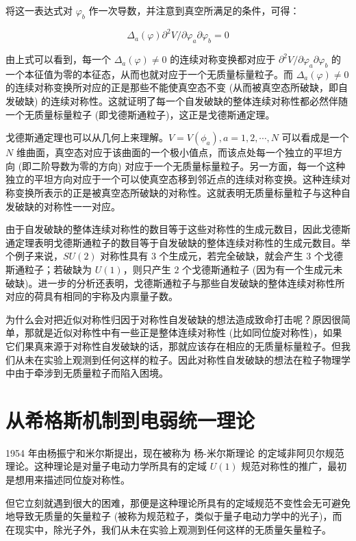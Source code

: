 \noindent 将这一表达式对 $\varphi_b$ 作一次导数，并注意到真空所满足的条件，可得：

\begin{equation}
    \Delta_a(\varphi) \partial^2 V/\partial \varphi_a \partial \varphi_b=0
\end{equation}

\noindent 由上式可以看到，每一个 $\Delta_a(\varphi) \ne 0$ 的连续对称变换都对应于 $\partial^2 V/\partial \varphi_a \partial \varphi_b$ 的一个本征值为零的本征态，从而也就对应于一个无质量标量粒子。而 $\Delta_a(\varphi) \ne 0$ 的连续对称变换所对应的正是那些不能使真空态不变 (从而被真空态所破缺，即自发破缺) 的连续对称性。这就证明了每一个自发破缺的整体连续对称性都必然伴随一个无质量标量粒子 (即戈德斯通粒子)，这正是戈德斯通定理。

戈德斯通定理也可以从几何上来理解。$V=V(\phi_a), a=1, 2, \cdots, N$ 可以看成是一个 $N$ 维曲面，真空态对应于该曲面的一个极小值点，而该点处每一个独立的平坦方向 (即二阶导数为零的方向) 对应于一个无质量标量粒子。另一方面，每一个这种独立的平坦方向对应于一个可以使真空态移到邻近点的连续对称变换。这种连续对称变换所表示的正是被真空态所破缺的对称性。这就表明无质量标量粒子与这种自发破缺的对称性一一对应。

由于自发破缺的整体连续对称性的数目等于这些对称性的生成元数目，因此戈德斯通定理表明戈德斯通粒子的数目等于自发破缺的整体连续对称性的生成元数目。举个例子来说，$SU(2)$ 对称性具有 $3$ 个生成元，若完全破缺，就会产生 $3$ 个戈德斯通粒子；若破缺为 $U(1)$，则只产生 $2$ 个戈德斯通粒子 (因为有一个生成元未破缺)。进一步的分析还表明，戈德斯通粒子与那些自发破缺的整体连续对称性所对应的荷具有相同的宇称及内禀量子数。

为什么会对把近似对称性归因于对称性自发破缺的想法造成致命打击呢？原因很简单，那就是近似对称性中有一些正是整体连续对称性 (比如同位旋对称性)，如果它们果真来源于对称性自发破缺的话，那就应该存在相应的无质量标量粒子。但我们从未在实验上观测到任何这样的粒子。因此对称性自发破缺的想法在粒子物理学中由于牵涉到无质量粒子而陷入困境。

\section{从希格斯机制到电弱统一理论}

1954 年由杨振宁和米尔斯提出，现在被称为 杨-米尔斯理论 的定域非阿贝尔规范理论。这种理论是对量子电动力学所具有的定域 $U(1)$ 规范对称性的推广，最初是想用来描述同位旋对称性。

但它立刻就遇到很大的困难，那便是这种理论所具有的定域规范不变性会无可避免地导致无质量的矢量粒子 (被称为规范粒子，类似于量子电动力学中的光子)，而在现实中，除光子外，我们从未在实验上观测到任何这样的无质量矢量粒子。

